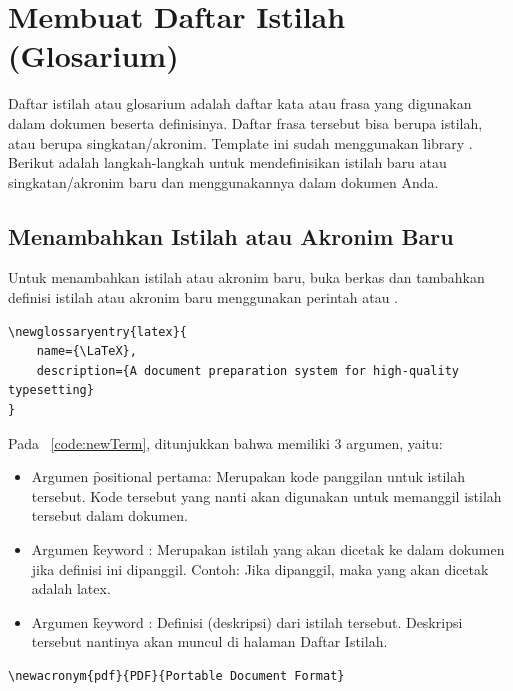 \section{Membuat Daftar Istilah (Glosarium)}
\label{sec:glossary}
Daftar istilah atau glosarium adalah daftar kata atau frasa yang digunakan dalam dokumen beserta definisinya.
Daftar frasa tersebut bisa berupa istilah, atau berupa singkatan/akronim.
Template ini sudah menggunakan \f{library} .
Berikut adalah langkah-langkah untuk mendefinisikan istilah baru atau singkatan/akronim baru dan menggunakannya dalam dokumen Anda.

\subsection{Menambahkan Istilah atau Akronim Baru}
Untuk menambahkan istilah atau akronim baru, buka berkas 
dan tambahkan definisi istilah atau akronim baru menggunakan perintah  atau .

\begin{lstlisting}[language={[latex]tex}, caption=Contoh definisi istilah baru, label=code:newTerm]
\newglossaryentry{latex}{
	name={\LaTeX},
	description={A document preparation system for high-quality typesetting}
}
\end{lstlisting}

Pada \lst~\ref{code:newTerm}, ditunjukkan bahwa  memiliki 3 argumen, yaitu:
\begin{itemize}
	\item Argumen \f{positional} pertama: Merupakan kode panggilan untuk istilah tersebut.
		Kode tersebut yang nanti akan digunakan untuk memanggil istilah tersebut dalam dokumen.
	\item Argumen \f{keyword} : Merupakan istilah yang akan dicetak ke dalam dokumen jika definisi ini dipanggil.
		Contoh: Jika  dipanggil, maka yang akan dicetak adalah \gls{latex}.
	\item Argumen \f{keyword} : Definisi (deskripsi) dari istilah tersebut.
		Deskripsi tersebut nantinya akan muncul di halaman Daftar Istilah.
\end{itemize}

\begin{lstlisting}[language={[latex]tex}, caption=Contoh definisi singkatan/akronim baru, label=code:newAcronym]
\newacronym{pdf}{PDF}{Portable Document Format}
\end{lstlisting}

